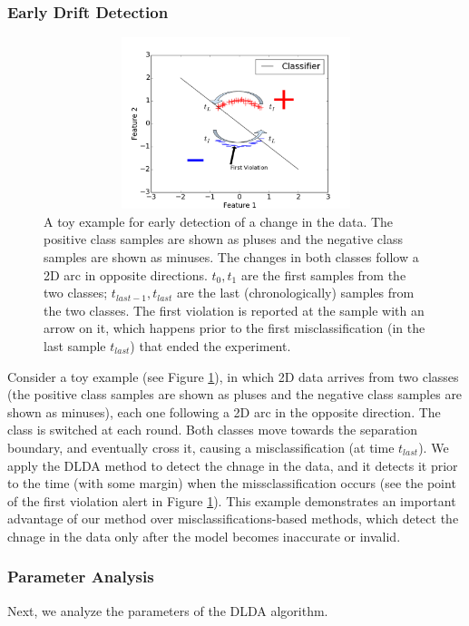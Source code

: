 \documentclass{vldb}
\begin{document}
\subsubsection{Early Drift Detection}\label{sec:earlydetection}
\begin{figure}[ht]
	\centering
	\includegraphics[width=120mm, height=5cm]{EarlyDetection.png}
	\caption{A toy example for early detection of a change in the data. The
	positive class samples are shown as pluses and the negative class samples are shown as minuses. The changes in both classes follow a 2D arc in opposite directions. $t_0, t_1$ are the first samples from the two classes; $t_{last-1}, t_{last}$ are the last (chronologically) samples from the two classes. The first violation is reported at the sample with an arrow on it, which happens prior to the first misclassification (in the  last sample $t_{last}$) that ended the experiment.}
	\label{EarlyDetection}
\end{figure}
Consider a toy example (see Figure \ref{EarlyDetection}), 
in which 2D data arrives from two classes (the positive class samples are shown as pluses and 
the negative class samples are shown as minuses), each one following a 2D arc in the opposite 
direction. 
The class is switched at each round. 
Both classes move towards the separation boundary, 
and eventually cross it, causing a misclassification (at time $t_{last}$). 
We apply the DLDA method to detect the chnage in the data, and it detects it
prior to the time (with some margin) when the missclassification occurs 
(see the point of the first violation alert in Figure \ref{EarlyDetection}). 
This example demonstrates an important advantage of our method over misclassifications-based 
methods, which detect the chnage in the data only after the model becomes inaccurate or invalid.

\subsubsection{Parameter Analysis}\label{sec:paramanal}
Next, we analyze the parameters of the DLDA algorithm.
\end{document}
